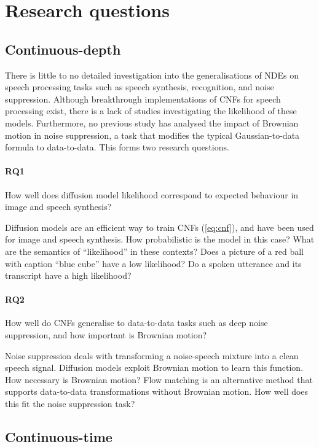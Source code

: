 \section{Research questions}
\subsection{Continuous-depth}
There is little to no detailed investigation into the generalisations of \acp{NDE} on speech processing tasks such as speech synthesis, recognition, and noise suppression. Although breakthrough implementations of \acp{CNF} for speech processing exist, there is a lack of studies investigating the likelihood of these models. Furthermore, no previous study has analysed the impact of Brownian motion in noise suppression, a task that modifies the typical Gaussian-to-data formula to data-to-data. This forms two research questions.


\paragraph{RQ1}
How well does diffusion model likelihood correspond to expected behaviour in image and speech synthesis?

Diffusion models are an efficient way to train \acp{CNF} (\eqref{eq:cnf}), and have been used for image and speech synthesis. How probabilistic is the model in this case? What are the semantics of ``likelihood'' in these contexts? Does a picture of a red ball with caption ``blue cube'' have a low likelihood? Do a spoken utterance and its transcript have a high likelihood?

\paragraph{RQ2}
How well do \acp{CNF} generalise to data-to-data tasks such as deep noise suppression, and how important is Brownian motion?

Noise suppression deals with transforming a noise-speech mixture into a clean speech signal. Diffusion models exploit Brownian motion to learn this function. How necessary is Brownian motion? Flow matching is an alternative method that supports data-to-data transformations without Brownian motion. How well does this fit the noise suppression task?

\subsection{Continuous-time}

